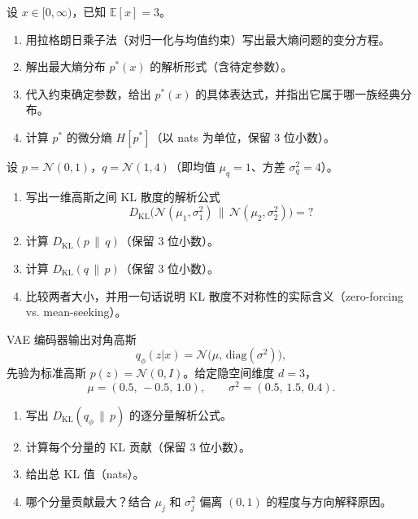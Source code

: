 \documentclass[12pt, a4paper]{ctexart}
\begin{document}
\begin{problem}[第 2 题：约束下的最大熵分布]
设 $x \in [0, \infty)$，已知 $\mathbb{E}[x] = 3$。

\begin{enumerate}[label=(\alph*)]
    \item 用拉格朗日乘子法（对归一化与均值约束）写出最大熵问题的变分方程。
    \item 解出最大熵分布 $p^*(x)$ 的解析形式（含待定参数）。
    \item 代入约束确定参数，给出 $p^*(x)$ 的具体表达式，并指出它属于哪一族经典分布。
    \item 计算 $p^*$ 的微分熵 $H[p^*]$（以 nats 为单位，保留 3 位小数）。
\end{enumerate}
\end{problem}

\begin{problem}[第 3 题：高斯分布之间的 KL 散度]
设 $p = \mathcal{N}(0, 1)$，$q = \mathcal{N}(1, 4)$（即均值 $\mu_q = 1$、方差 $\sigma_q^2 = 4$）。

\begin{enumerate}[label=(\alph*)]
    \item 写出一维高斯之间 KL 散度的解析公式
    \[
    D_{\mathrm{KL}}\!\big(\mathcal{N}(\mu_1, \sigma_1^2) \,\|\, \mathcal{N}(\mu_2, \sigma_2^2)\big) = ?
    \]
    \item 计算 $D_{\mathrm{KL}}(p \,\|\, q)$（保留 3 位小数）。
    \item 计算 $D_{\mathrm{KL}}(q \,\|\, p)$（保留 3 位小数）。
    \item 比较两者大小，并用一句话说明 KL 散度不对称性的实际含义（zero-forcing vs. mean-seeking）。
\end{enumerate}
\end{problem}

\begin{problem}
VAE 编码器输出对角高斯
\[
q_\phi(z|x) = \mathcal{N}\!\big(\mu, \, \mathrm{diag}(\sigma^2)\big),
\]
先验为标准高斯 $p(z) = \mathcal{N}(0, I)$。给定隐空间维度 $d = 3$，
\[
\mu = (0.5, \, -0.5, \, 1.0), \qquad \sigma^2 = (0.5, \, 1.5, \, 0.4).
\]

\begin{enumerate}[label=(\alph*)]
    \item 写出 $D_{\mathrm{KL}}(q_\phi \,\|\, p)$ 的逐分量解析公式。
    \item 计算每个分量的 KL 贡献（保留 3 位小数）。
    \item 给出总 KL 值（nats）。
    \item 哪个分量贡献最大？结合 $\mu_j$ 和 $\sigma_j^2$ 偏离 $(0, 1)$ 的程度与方向解释原因。
\end{enumerate}
\end{problem}
\end{document}
